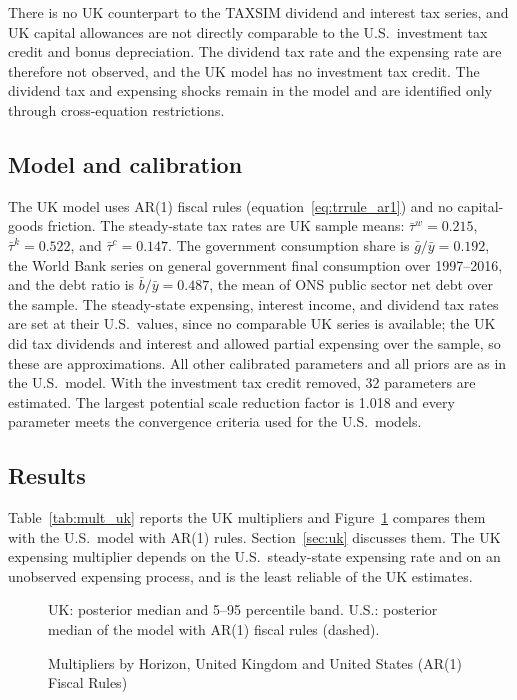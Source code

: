 There is no UK counterpart to the TAXSIM dividend and interest tax series, and UK capital allowances are not directly comparable to the U.S.\ investment tax credit and bonus depreciation. The dividend tax rate and the expensing rate are therefore not observed, and the UK model has no investment tax credit. The dividend tax and expensing shocks remain in the model and are identified only through cross-equation restrictions.

\subsection*{Model and calibration}

The UK model uses AR(1) fiscal rules (equation~\ref{eq:trrule_ar1}) and no capital-goods friction. The steady-state tax rates are UK sample means: $\bar{\tau}^w = 0.215$, $\bar{\tau}^k = 0.522$, and $\bar{\tau}^c = 0.147$. The government consumption share is $\bar{g}/\bar{y} = 0.192$, the World Bank series on general government final consumption over 1997--2016, and the debt ratio is $\bar{b}/\bar{y} = 0.487$, the mean of ONS public sector net debt over the sample. The steady-state expensing, interest income, and dividend tax rates are set at their U.S.\ values, since no comparable UK series is available; the UK did tax dividends and interest and allowed partial expensing over the sample, so these are approximations. All other calibrated parameters and all priors are as in the U.S.\ model. With the investment tax credit removed, 32 parameters are estimated. The largest potential scale reduction factor is 1.018 and every parameter meets the convergence criteria used for the U.S.\ models.

\subsection*{Results}

Table~\ref{tab:mult_uk} reports the UK multipliers and Figure~\ref{fig:mult_uk} compares them with the U.S.\ model with AR(1) rules. Section~\ref{sec:uk} discusses them. The UK expensing multiplier depends on the U.S.\ steady-state expensing rate and on an unobserved expensing process, and is the least reliable of the UK estimates.



\begin{figure}[ht]
\centering
{}
\caption{Multipliers by Horizon, United Kingdom and United States (AR(1) Fiscal Rules)}
\label{fig:mult_uk}
\par\footnotesize UK: posterior median and 5--95 percentile band. U.S.: posterior median of the model with AR(1) fiscal rules (dashed).
\end{figure}


